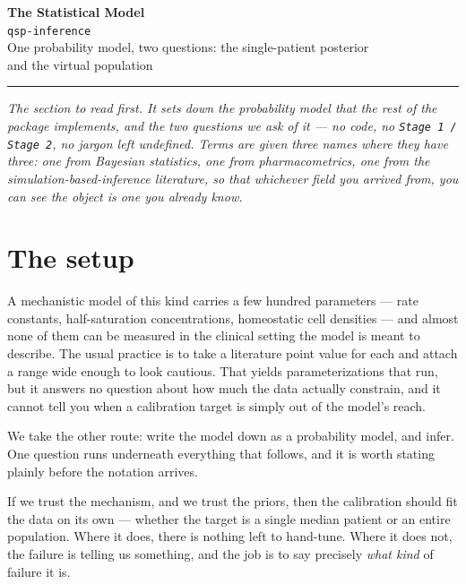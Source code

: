 \documentclass[11pt]{article}
\begin{document}
\begin{center}
  {\LARGE\bfseries\color{accent} The Statistical Model}\\[5pt]
  {\large\color{accent}\texttt{qsp-inference}}\\[12pt]
  {\small One probability model, two questions: the single-patient posterior}\\
  {\small and the virtual population}\\[10pt]
  {\color{softgray}\rule{0.35\textwidth}{0.4pt}}
\end{center}

\vspace{0.6em}

\noindent\emph{The section to read first. It sets down the probability model that the
rest of the package implements, and the two questions we ask of it --- no code, no
\texttt{Stage 1 / Stage 2}, no jargon left undefined. Terms are given three names where
they have three: one from Bayesian statistics, one from pharmacometrics, one from the
simulation-based-inference literature, so that whichever field you arrived from, you can
see the object is one you already know.}

\vspace{0.8em}

\section{The setup}

A mechanistic model of this kind carries a few hundred parameters --- rate constants,
half-saturation concentrations, homeostatic cell densities --- and almost none of them
can be measured in the clinical setting the model is meant to describe. The usual
practice is to take a literature point value for each and attach a range wide enough to
look cautious. That yields parameterizations that run, but it answers no question about
how much the data actually constrain, and it cannot tell you when a calibration target
is simply out of the model's reach.

We take the other route: write the model down as a probability model, and infer. One
question runs underneath everything that follows, and it is worth stating plainly before
the notation arrives.

\begin{keybox}
If we trust the mechanism, and we trust the priors, then the calibration should fit the
data on its own --- whether the target is a single median patient or an entire
population. Where it does, there is nothing left to hand-tune. Where it does not, the
failure is telling us something, and the job is to say precisely \emph{what kind} of
failure it is.
\end{keybox}
\end{document}
